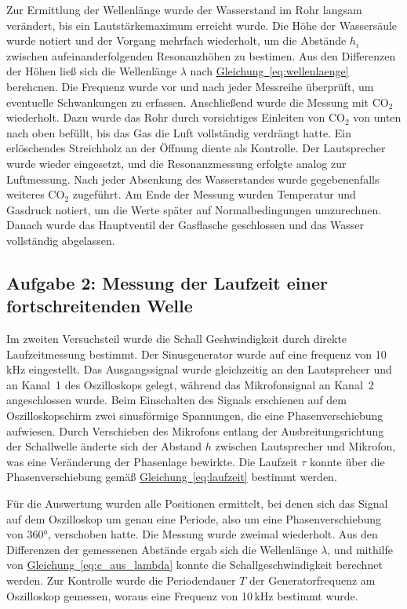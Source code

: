 Zur Ermittlung der Wellenlänge wurde der Wasserstand im Rohr langsam verändert, bis ein Lautstärkemaximum erreicht wurde. Die Höhe der Wassersäule wurde notiert und der Vorgang mehrfach wiederholt, um die Abstände $h_i$ zwischen aufeinanderfolgenden Resonanzhöhen zu bestimen. Aus den Differenzen der Höhen ließ sich die Wellenlänge $\lambda$ nach \hyperref[eq:wellenlaenge]{Gleichung~\ref*{eq:wellenlaenge}} berehcnen. Die Frequenz wurde vor und nach jeder Messreihe überprüft, um eventuelle Schwankungen zu erfassen. Anschließend wurde die Messung mit CO$_2$ wiederholt. Dazu wurde das Rohr durch vorsichtiges Einleiten von CO$_2$ von unten nach oben befüllt, bis das Gas die Luft vollständig verdrängt hatte. Ein erlöschendes Streichholz an der Öffnung diente als Kontrolle. Der Lautsprecher wurde wieder eingesetzt, und die Resonanzmessung erfolgte analog zur Luftmessung. Nach jeder Absenkung des Wasserstandes wurde gegebenenfalls weiteres CO$_2$ zugeführt. Am Ende der Messung wurden Temperatur und Gasdruck notiert, um die Werte später auf Normalbedingungen umzurechnen. Danach wurde das Hauptventil der Gasflasche geschlossen und das Wasser vollständig abgelassen.

\subsection*{Aufgabe 2: Messung der Laufzeit einer fortschreitenden Welle}

Im zweiten Versuchsteil wurde die Schall Geshwindigkeit durch direkte Laufzeitmessung bestimmt. Der Sinusgenerator wurde auf eine frequenz von 10\,kHz eingestellt. Das Ausgangssignal wurde gleichzeitig an den Lautsprehcer und an Kanal~1 des Oszilloskops gelegt, während das Mikrofonsignal an Kanal~2 angeschlossen wurde. Beim Einschalten des Signals erschienen auf dem Oszilloskopschirm zwei sinusförmige Spannungen, die eine Phasenverschiebung aufwiesen. Durch Verschieben des Mikrofons entlang der Ausbreitungsrichtung der Schallwelle änderte sich der Abstand $h$ zwischen Lautsprecher und Mikrofon, was eine Veränderung der Phasenlage bewirkte. Die Laufzeit $\tau$ konnte über die Phasenverschiebung gemäß \hyperref[eq:laufzeit]{Gleichung~\ref*{eq:laufzeit}} bestimmt werden.

Für die Auswertung wurden alle Positionen ermittelt, bei denen sich das Signal auf dem Oszilloskop um genau eine Periode, also um eine Phasenverschiebung von 360°, verschoben hatte. Die Messung wurde zweimal wiederholt. Aus den Differenzen der gemessenen Abstände ergab sich die Wellenlänge $\lambda$, und mithilfe von \hyperref[eq:c_aus_lambda]{Gleichung~\ref*{eq:c_aus_lambda}} konnte die Schallgeschwindigkeit berechnet werden. Zur Kontrolle wurde die Periodendauer $T$ der Generatorfrequenz am Oszilloskop gemessen, woraus eine Frequenz von 10\,kHz bestimmt wurde.

